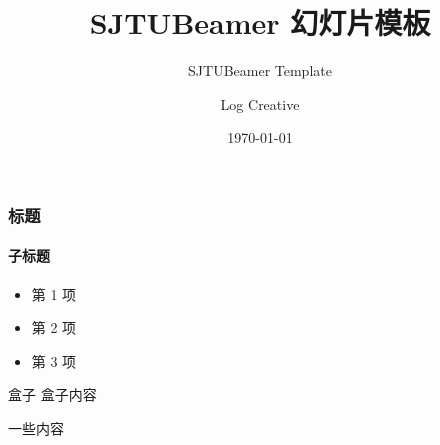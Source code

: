 \documentclass{beamer}
\title{\textsf{SJTUBeamer} 幻灯片模板}
\subtitle{SJTUBeamer Template}
\author{Log Creative}
\institute[]{github.com/LogCreative}
\date{\today}
\begin{document}
    

    \maketitle


    \begin{frame}
        \frametitle{标题}
        \framesubtitle{子标题}

        \begin{itemize}
            \item 第 1 项
            \item 第 2 项
            \item 第 3 项
        \end{itemize}

        \begin{block}{盒子}
            盒子内容
        \end{block}
    \end{frame}

    \begin{frame}
        一些内容
    \end{frame}
\end{document}

